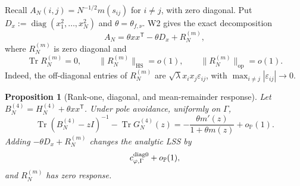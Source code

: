 \documentclass[11pt]{article}
\newtheorem{proposition}[theorem]{Proposition}
\theoremstyle{definition}
\theoremstyle{remark}
\newcommand{\Tr}{\operatorname{Tr}}
\newcommand{\diag}{\operatorname{diag}}
\newcommand{\op}{\mathrm{op}}
\newcommand{\HS}{\mathrm{HS}}
\newcommand{\norm}[1]{\lVert #1\rVert}
\begin{document}
Recall \(A_N(i,j)=N^{-1/2}m(s_{ij})\) for \(i\ne j\), with zero diagonal.
Put \(D_x:=\diag(x_1^2,\ldots,x_N^2)\) and
\(\theta=\theta_{f,\nu}\).  W2 gives the exact decomposition
\begin{equation}\label{eq:R4-mean-decomp}
 A_N=\theta xx^{\mathsf T}-\theta D_x+R_N^{(m)},
\end{equation}
where \(R_N^{(m)}\) is zero diagonal and
\begin{equation}\label{eq:R4-mean-rem}
 \Tr R_N^{(m)}=0,\qquad
 \norm{R_N^{(m)}}_{\HS}=o(1),\qquad
 \norm{R_N^{(m)}}_{\op}=o(1).
\end{equation}
Indeed, the off-diagonal entries of \(R_N^{(m)}\) are
\(\sqrt\lambda x_ix_j\varepsilon_{ij}\), with
\(\max_{i\ne j}|\varepsilon_{ij}|\to0\).

\begin{proposition}[Rank-one, diagonal, and mean-remainder response]
\label{prop:R4-deterministic-response}
Let \(B_N^{(4)}=H_N^{(4)}+\theta xx^{\mathsf T}\).  Under pole avoidance,
uniformly on \(\Gamma\),
\begin{equation}\label{eq:R4-Woodbury-trace}
 \Tr(B_N^{(4)}-zI)^{-1}-\Tr G_N^{(4)}(z)
 =
 -\frac{\theta m'(z)}{1+\theta m(z)}
 +o_{\mathbb P}(1).
\end{equation}
Adding \(-\theta D_x+R_N^{(m)}\) changes the analytic LSS by
\begin{equation}\label{eq:R4-diag-response}
 c_{\varphi,\Gamma}^{\rm diag0}+o_{\mathbb P}(1),
\end{equation}
and \(R_N^{(m)}\) has zero response.
\end{proposition}
\end{document}
